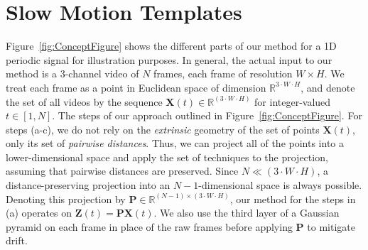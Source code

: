 \documentclass{article}
\newcommand{\mb}{\mathbf}
\begin{document}
\section{Slow Motion Templates}
\label{sec:methods}


Figure~\ref{fig:ConceptFigure} shows the different parts of our method for a 1D periodic signal for illustration purposes. In general, the actual input to our method is a 3-channel video of $N$ frames, each frame of resolution $W \times H$. We treat each frame as a point in Euclidean space of dimension $\mathbb{R}^{3 \cdot W \cdot H}$, and denote the set of all videos by the sequence $\mb{X}(t) \in \mathbb{R}^{(3 \cdot W \cdot H)}$ for integer-valued $t \in [1,N]$. The steps of our approach outlined in Figure~\ref{fig:ConceptFigure}.  For steps (a-c), we do not rely on the {\em extrinsic} geometry of the set of points $\mb{X}(t)$, only its set of {\em pairwise distances}. Thus, we can project all of the points into a lower-dimensional space and apply the set of techniques to the projection, assuming that pairwise distances are preserved. Since $N \ll (3 \cdot W \cdot H)$, a distance-preserving projection into an $N-1$-dimensional space is always possible. Denoting this projection by $\mb{P} \in \mathbb{R}^{(N-1) \times (3 \cdot W \cdot H)}$, our method for the steps in (a) operates on $\mb{Z}(t) = \mb{P} \mb{X}(t)$.  We also use the third layer of a Gaussian pyramid on each frame in place of the raw frames before applying $\mb{P}$ to mitigate drift.

\end{document}
